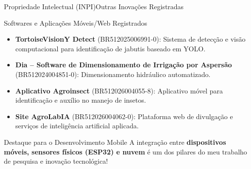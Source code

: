 \documentclass[9pt]{beamer}
\begin{document}
\begin{frame}{Propriedade Intelectual (INPI)}{Outras Inovações Registradas}
  \begin{block}{Softwares e Aplicações Móveis/Web Registrados}
    \begin{itemize}
      \item \textbf{TortoiseVisionY Detect} (BR512025006991-0): Sistema de detecção e visão computacional para identificação de jabutis baseado em YOLO.
      \item \textbf{Dia -- Software de Dimensionamento de Irrigação por Aspersão} (BR512024004851-0): Dimensionamento hidráulico automatizado.
      \item \textbf{Aplicativo Agroinsect} (BR512026004055-8): Aplicativo móvel para identificação e auxílio no manejo de insetos.
      \item \textbf{Site AgroLabIA} (BR512026004062-0): Plataforma web de divulgação e serviços de inteligência artificial aplicada.
    \end{itemize}
  \end{block}

  \begin{exampleblock}{Destaque para o Desenvolvimento Mobile}
    A integração entre \textbf{dispositivos móveis, sensores físicos (ESP32) e nuvem} é um dos pilares do meu trabalho de pesquisa e inovação tecnológica!
  \end{exampleblock}
\end{frame}

\end{document}
